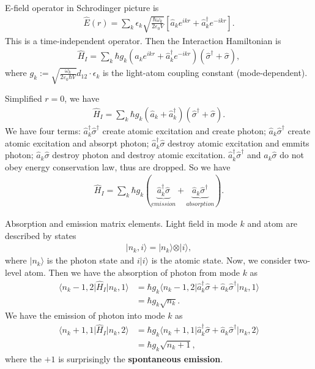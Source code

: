 \documentclass[../../note.tex]{subfiles}
\begin{document}
E-field operator in Schrodinger picture is 
\begin{align}
    \hat{E}(r) = \sum_k \epsilon_k \sqrt{\frac{\hbar \omega_k}{2 \varepsilon_0 V}} \left[\hat{a}_k e^{ikr} + \hat{a}_k^{\dagger} e^{-ikr}\right].
\end{align}
This is a time-independent operator. Then the Interaction Hamiltonian is 
\begin{align}
    \hat{H}_I = \sum_{k} \hbar g_k \left(\hat{a}_k e^{ikr} + \hat{a}^{\dagger}_k e^{-ikr} \right) \left(\hat{\sigma}^{\dagger} + \hat{\sigma}\right),
\end{align}
where $g_k := \sqrt{\frac{\omega_k}{2 \varepsilon_0 \hbar V}} d_{12} \cdot \epsilon_k$ is the light-atom coupling constant (mode-dependent).

Simplified $r = 0$, we have
\begin{align}
    \hat{H}_I = \sum_k \hbar g_k (\hat{a}_k + \hat{a}_k^{\dagger})(\hat{\sigma}^{\dagger} + \hat{\sigma}).
\end{align}
We have four terms: $\hat{a}_k^{\dagger} \hat{\sigma}^{\dagger}$ create atomic excitation and create photon; $\hat{a}_k \hat{\sigma}^{\dagger}$ create atomic excitation and absorpt photon; $\hat{a}_k^{\dagger}\hat{\sigma}$ destroy atomic excitation and emmits photon; $\hat{a}_k \hat{\sigma}$ destroy photon and destroy atomic excitation. $\hat{a}_k^{\dagger} \hat{\sigma}^{\dagger}$ and  $\hat{a}_k \hat{\sigma}$ do not obey energy conservation law, thus are dropped. So we have
\begin{align}
    \hat{H}_I = \sum_{k} \hbar g_k (\underbrace{\hat{a}_k^{\dagger} \hat{\sigma}}_{emission} + \underbrace{\hat{a}_k \hat{\sigma}^{\dagger}}_{absorption}).
\end{align}

Absorption and emission matrix elements. Light field in mode $k$ and atom are described by states
\begin{align}
    \vert n_k, i \rangle = \vert n_k \rangle \otimes \vert i \rangle,
\end{align}
where $\vert n_k \rangle$ is the photon state and $i\vert i \rangle$ is the atomic state. Now, we consider two-level atom. Then we have the absorption of photon from mode $k$ as 
\begin{align}
    \langle n_k -1, 2 \vert \hat{H}_I \vert n_k, 1 \rangle
    &= \hbar g_k \langle n_k -1, 2 \vert {\hat{a}_k^{\dagger} \hat{\sigma}} + {\hat{a}_k \hat{\sigma}^{\dagger}} \vert n_k, 1 \rangle \\
    &= \hbar g_k \sqrt{n_k}.
\end{align} 
We have the emission of photon into mode $k$ as 
\begin{align}
    \langle n_k +1, 1 \vert \hat{H}_I \vert n_k, 2 \rangle
    &= \hbar g_k \langle n_k +1, 1 \vert {\hat{a}_k^{\dagger} \hat{\sigma}} + {\hat{a}_k \hat{\sigma}^{\dagger}} \vert n_k, 2 \rangle \\
    &= \hbar g_k \sqrt{n_k + 1},
\end{align} 
where the $+1$ is surprisingly the \textbf{spontaneous emission}.
\end{document}
